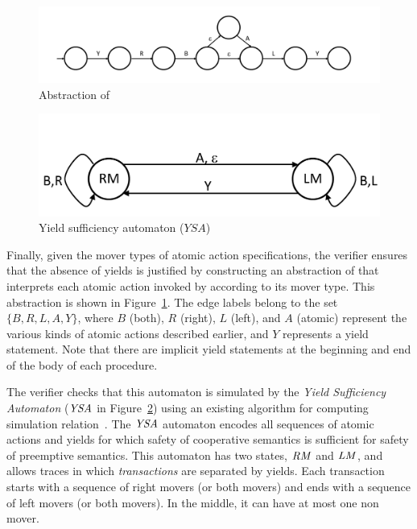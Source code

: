 \begin{figure}
\begin{center}
\includegraphics[scale=0.35]{MidWB.pdf}
\end{center}
\caption{Abstraction of }
\label{fig:midwb}
\end{figure}

\begin{figure}
\begin{center}
\includegraphics[scale=0.35]{YieldTypeCheckingAutomaton.pdf}
\end{center}
\caption{Yield sufficiency automaton ($YSA$)}
\label{fig:ysa}
\end{figure}

Finally, given the mover types of atomic action specifications, the \civl verifier ensures
that the absence of yields is justified by constructing an abstraction of  
that interprets each atomic action invoked by  according to its mover type.
This abstraction is shown in Figure~\ref{fig:midwb}.
The edge labels belong to the set $\{B,R,L,A,Y\}$, where $B$ (both), $R$ (right), $L$ (left), and $A$ (atomic) 
represent the various kinds of atomic actions described earlier, and $Y$ represents a yield statement.
Note that there are implicit yield statements at the beginning and end of the body of each procedure.

The \civl verifier checks that this automaton is simulated by the {\em Yield Sufficiency Automaton\/} ($\mathit{YSA}$ in Figure~\ref{fig:ysa})
using an existing algorithm for computing simulation relation~\cite{HenzingerHK95}.
The $\mathit{YSA}$ automaton encodes all sequences of atomic actions and yields for which safety of cooperative semantics is sufficient 
for safety of preemptive semantics.
This automaton has two states, $\mathit{RM}$ and $\mathit{LM}$,
and allows traces in which {\em transactions\/} are separated by yields.
Each transaction starts with a sequence of right movers (or both movers) and ends with a sequence of left movers (or both movers).
In the middle, it can have at most one non mover.

